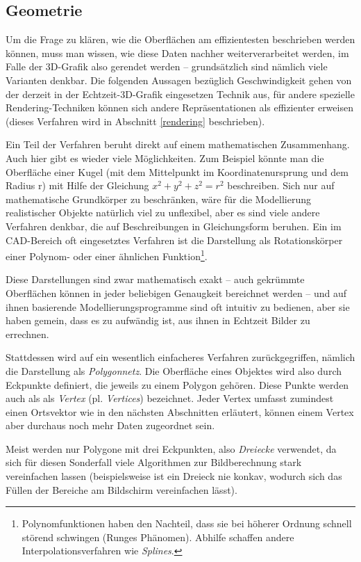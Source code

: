 \subsection{Geometrie}
Um die Frage zu klären, wie die Oberflächen am effizientesten beschrieben werden können, muss man wissen, wie diese Daten nachher weiterverarbeitet werden, im Falle der 3D-Grafik also gerendet werden -- grundsätzlich sind nämlich viele Varianten denkbar. Die folgenden Aussagen bezüglich Geschwindigkeit gehen von der derzeit in der Echtzeit-3D-Grafik eingesetzen Technik aus, für andere spezielle Rendering-Techniken können sich andere Repräsentationen als effizienter erweisen (dieses Verfahren wird in Abschnitt \ref{rendering} beschrieben).

Ein Teil der Verfahren beruht direkt auf einem mathematischen Zusammenhang. Auch hier gibt es wieder viele Möglichkeiten. Zum Beispiel könnte man die Oberfläche einer Kugel (mit dem Mittelpunkt im Koordinatenursprung und dem Radius r) mit Hilfe der Gleichung $x^2 + y^2 + z^2 = r^2$ beschreiben. Sich nur auf mathematische Grundkörper zu beschränken, wäre für die Modellierung realistischer Objekte natürlich viel zu unflexibel, aber es sind viele andere Verfahren denkbar, die auf Beschreibungen in Gleichungsform beruhen. Ein im CAD-Bereich oft eingesetztes Verfahren ist die Darstellung als Rotationskörper einer Polynom- oder einer ähnlichen Funktion\footnote{Polynomfunktionen haben den Nachteil, dass sie bei höherer Ordnung schnell störend schwingen (Runges Phänomen). Abhilfe schaffen andere Interpolationsverfahren wie \emph{Splines}.}.

Diese Darstellungen sind zwar mathematisch exakt -- auch gekrümmte Oberflächen können in jeder beliebigen Genaugkeit bereichnet werden -- und auf ihnen basierende Modellierungsprogramme sind oft intuitiv zu bedienen, aber sie haben gemein, dass es zu aufwändig ist, aus ihnen in Echtzeit Bilder zu errechnen.

Stattdessen wird auf ein wesentlich einfacheres Verfahren zurückgegriffen, nämlich die Darstellung als \emph{Polygonnetz}. Die Oberfläche eines Objektes wird also durch Eckpunkte definiert, die jeweils zu einem Polygon gehören. Diese Punkte werden auch als als \emph{Vertex} (pl. \emph{Vertices}) bezeichnet. Jeder Vertex umfasst zumindest einen Ortsvektor wie in den nächsten Abschnitten erläutert, können einem Vertex aber durchaus noch mehr Daten zugeordnet sein.

Meist werden nur Polygone mit drei Eckpunkten, also \emph{Dreiecke} verwendet, da sich für diesen Sonderfall viele Algorithmen zur Bildberechnung stark vereinfachen lassen (beispielsweise ist ein Dreieck nie konkav, wodurch sich das Füllen der Bereiche am Bildschirm vereinfachen lässt).

